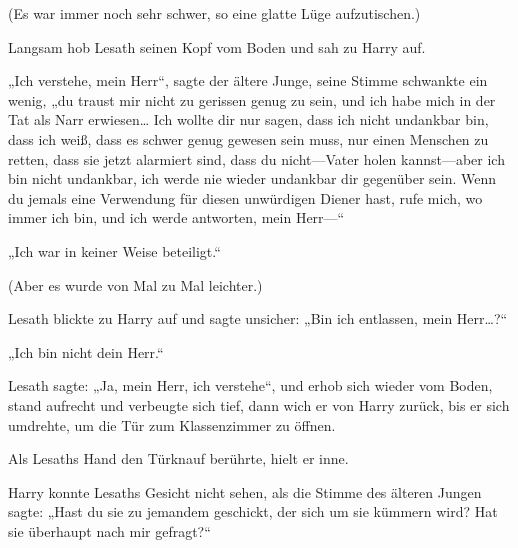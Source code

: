 (Es war immer noch sehr schwer, so eine glatte Lüge aufzutischen.)

Langsam hob Lesath seinen Kopf vom Boden und sah zu Harry auf.

„Ich verstehe, mein Herr“, sagte der ältere Junge, seine Stimme schwankte ein wenig, „du traust mir nicht zu gerissen genug zu sein, und ich habe mich in der Tat als Narr erwiesen… Ich wollte dir nur sagen, dass ich nicht undankbar bin, dass ich weiß, dass es schwer genug gewesen sein muss, nur einen Menschen zu retten, dass sie jetzt alarmiert sind, dass du nicht—Vater holen kannst—aber ich bin nicht undankbar, ich werde nie wieder undankbar dir gegenüber sein. Wenn du jemals eine Verwendung für diesen unwürdigen Diener hast, rufe mich, wo immer ich bin, und ich werde antworten, mein Herr—“

„Ich war in keiner Weise beteiligt.“

(Aber es wurde von Mal zu Mal leichter.)

Lesath blickte zu Harry auf und sagte unsicher: „Bin ich entlassen, mein Herr…?“

„Ich bin nicht dein Herr.“

Lesath sagte: „Ja, mein Herr, ich verstehe“, und erhob sich wieder vom Boden, stand aufrecht und verbeugte sich tief, dann wich er von Harry zurück, bis er sich umdrehte, um die Tür zum Klassenzimmer zu öffnen.

Als Lesaths Hand den Türknauf berührte, hielt er inne.

Harry konnte Lesaths Gesicht nicht sehen, als die Stimme des älteren Jungen sagte: „Hast du sie zu jemandem geschickt, der sich um sie kümmern wird? Hat sie überhaupt nach mir gefragt?“

